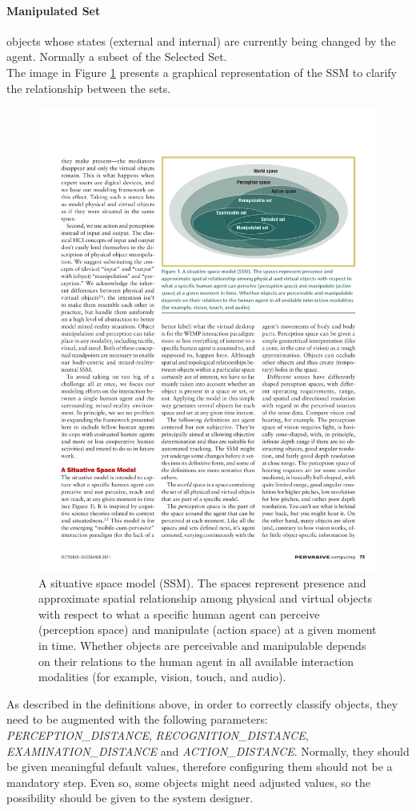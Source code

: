 \paragraph{Manipulated Set} objects whose states (external and internal) are currently being changed by the agent. Normally a subset of the Selected Set.\\

The image in Figure \ref{fig:req_ssm_sets} presents a graphical representation of the SSM to clarify the relationship between the sets.
\begin{figure}[H]
	\centering
	\includegraphics[width=0.7\linewidth]{gfx/Chapter3/ssm_sets}
	\caption{A situative space model (SSM). The spaces represent presence and approximate spatial relationship among physical and virtual objects with respect to what a specific human agent can perceive (perception space) and manipulate (action space) at a given moment in time. Whether objects are perceivable and manipulable depends on their relations to the human agent in all available interaction modalities (for example, vision, touch, and audio).\cite{pederson2011situative}}
	\label{fig:req_ssm_sets}
\end{figure}

As described in the definitions above, in order to correctly classify objects, they need to be augmented with the following parameters: \emph{PERCEPTION\_DISTANCE}, \emph{RECOGNITION\_DISTANCE}, \emph{EXAMINATION\_DISTANCE} and \emph{ACTION\_DISTANCE}. Normally, they should be given meaningful default values, therefore configuring them should not be a mandatory step. Even so, some objects might need adjusted values, so the possibility should be given to the system designer.
